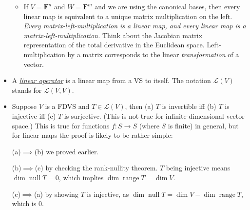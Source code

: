 \documentclass[11pt]{article}
\newcommand{\df}[1]{\ul{\textit{\textsf{#1}}}}
\newcommand{\F}{\mathbf{F}}
\newcommand{\n}{\operatorname{null}}
\renewcommand{\r}{\operatorname{range}}
\renewcommand{\d}{\dim}
\newcommand{\LV}{\mathcal{L}(V)}
\begin{document}
\begin{itemize}
\begin{itemize}
        \item If $V = \F^n$ and $W = \F^m$ and we are using the canonical bases, then every linear map is equivalent to a unique matrix multiplication on the left. \emph{Every matrix-left-multiplication is a linear map, and every linear map is a matrix-left-multiplication.} Think about the Jacobian matrix representation of the total derivative in the Euclidean space. Left-multiplication by a matrix corresponds to the linear \emph{transformation} of a vector.
    \end{itemize}
    \item A \df{linear operator} is a linear map from a VS to itself. The notation $\LV$ stands for $\mathcal{L}(V,V)$.
    \item Suppose $V$ is a FDVS and $T \in \LV$, then (a) $T$ is invertible iff (b) $T$ is injective iff (c) $T$ is surjective. (This is not true for infinite-dimensional vector space.) This is true for functions $f:S \to S$ (where $S$ is finite) in general, but for linear maps the proof is likely to be rather simple:
        
    (a)$\implies$(b) we proved earlier.
        
    (b)$\implies$(c) by checking the rank-nullity theorem. $T$ being injective means $\d \n T = 0$, which implies $\d \r T = \d V$.
        
    (c)$\implies$(a) by showing $T$ is injective, as $\d \n T = \d V - \d \r T$, which is 0.
\end{itemize}
\end{document}
